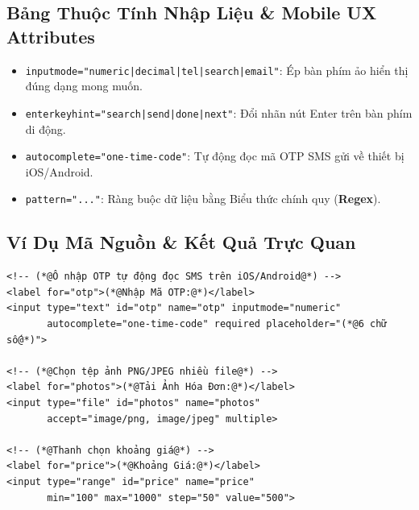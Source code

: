 \documentclass[11pt,oneside]{book}
\newcommand{\codeinline}[1]{\textcolor{accentOrange}{\texttt{#1}}}
\newcommand{\term}[1]{\textbf{\textcolor{primaryBlue}{#1}}}
\begin{document}
\subsection{Bảng Thuộc Tính Nhập Liệu \& Mobile UX Attributes}

\begin{conceptBox}
\begin{itemize}[leftmargin=1.5em, itemsep=3pt, parsep=0pt]
    \item \codeinline{inputmode="numeric|decimal|tel|search|email"}: Ép bàn phím ảo hiển thị đúng dạng mong muốn.
    \item \codeinline{enterkeyhint="search|send|done|next"}: Đổi nhãn nút Enter trên bàn phím di động.
    \item \codeinline{autocomplete="one-time-code"}: Tự động đọc mã OTP SMS gửi về thiết bị iOS/Android.
    \item \codeinline{pattern="..."}: Ràng buộc dữ liệu bằng Biểu thức chính quy (\term{Regex}).
\end{itemize}
\end{conceptBox}

\subsection{Ví Dụ Mã Nguồn \& Kết Quả Trực Quan}

\begin{codeWindow}
\begin{lstlisting}[language=HTML5]
<!-- (*@Ô nhập OTP tự động đọc SMS trên iOS/Android@*) -->
<label for="otp">(*@Nhập Mã OTP:@*)</label>
<input type="text" id="otp" name="otp" inputmode="numeric" 
       autocomplete="one-time-code" required placeholder="(*@6 chữ số@*)">

<!-- (*@Chọn tệp ảnh PNG/JPEG nhiều file@*) -->
<label for="photos">(*@Tải Ảnh Hóa Đơn:@*)</label>
<input type="file" id="photos" name="photos" 
       accept="image/png, image/jpeg" multiple>

<!-- (*@Thanh chọn khoảng giá@*) -->
<label for="price">(*@Khoảng Giá:@*)</label>
<input type="range" id="price" name="price" 
       min="100" max="1000" step="50" value="500">
\end{lstlisting}
\end{codeWindow}
\end{document}
